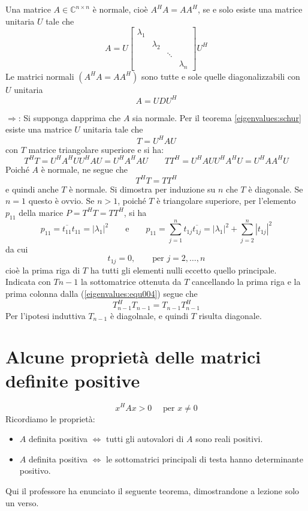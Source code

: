 \begin{theo}
Una matrice $A \in \mathbb{C}^{n\times n}$ \`e normale, cio\`e
$A^{H}A = AA^{H}$, se e solo esiste una matrice unitaria $U$ tale che
$$ A = U
\left[
\begin{array}{cccc}
\lambda_1 & & &  \\
& \lambda_2 & &  \\
 & & \ddots &  \\
 & &  & \lambda_n 
\end{array}
\right]
U^{H}
$$
 Le matrici normali  $(A^{H}A = AA^{H})$
 sono tutte e sole quelle diagonalizzabili con $U$ unitaria 
 $$ A= UDU^{H}$$
\end{theo}
\begin{thproof}
 $\Longrightarrow$:
Si supponga dapprima che $A$ sia normale. Per il teorema
\ref{eigenvalues:schur}
esiste una matrice $U$ unitaria tale che
$$T = U^{H}AU$$
con $T$ matrice triangolare superiore e si ha:
$$ T^{H}T = U^{H}A^{H}UU^{H}AU = U^{H}A^{H}AU \qquad
TT^{H} = U^{H}AUU^{H}A^{H}U = U^{H}AA^{H}U $$
Poich\'e $A$ \`e normale, ne segue che
\begin{equation}
\label{eigenvalues:equ004}
 T^{H}T = TT^{H}
\end{equation}
e quindi anche $T$ \`e normale. Si dimostra per induzione su $n$
che $T$ \`e diagonale. Se $n=1$ questo \`e ovvio. Se
$n>1$, poich\'e $T$ \`e triangolare superiore, per l'elemento $p_{11}$
della marice $P=T^{H}T = TT^{H}$, si ha
$$p_{11} = \overline{t_{11}}t_{11} = | \lambda_1|^{2} 
\qquad \text{e} \qquad
p_{11} = \displaystyle \sum_{j=1}^{n} 
 t_{1j}\overline{t_{1j}} = |\lambda_1|^{2} + 
\displaystyle \sum_{j=2}^{n} |t_{1j}|^{2} $$
da cui
$$ t_{1j}=0, \qquad \text{per } j=2, \ldots, n$$
cio\`e la prima riga di $T$ ha tutti gli elementi nulli eccetto quello
principale. Indicata con $T{n-1}$ la sottomatrice ottenuta da $T$
cancellando la prima riga e la prima colonna dalla (\ref{eigenvalues:equ004})
segue che
$$T_{n-1}^{H} T_{n-1} = T_{n-1}T_{n-1}^{H}$$
Per l'ipotesi induttiva $T_{n-1}$ \`e diagolnale, e quindi
$T$ risulta diagonale.
\end{thproof}

\section{Alcune propriet\`a delle matrici definite positive}
 $$ x^{H}Ax > 0 \quad \text{ per } x\neq 0 $$ 
Ricordiamo le propriet\`a:
\begin{itemize}
 \item $A$ definita positiva $ \Longleftrightarrow $ tutti gli autovalori di $A$ sono reali positivi.
 \item $A$ definita positiva $ \Longleftrightarrow $  le sottomatrici principali di testa
hanno determinante positivo.
\end{itemize}
\begin{notes}
 Qui il professore ha enunciato il seguente teorema, dimostrandone a
 lezione solo un verso.
\end{notes}

